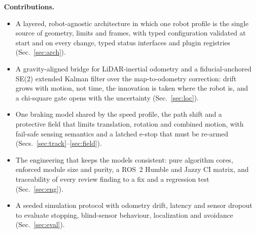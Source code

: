 \textbf{Contributions.}
\begin{itemize}
  \item A layered, robot-agnostic architecture in which one robot profile is the single source
    of geometry, limits and frames, with typed configuration validated at start and on every
    change, typed status interfaces and plugin registries (Sec.~\ref{sec:arch}).
  \item A gravity-aligned bridge for LiDAR-inertial odometry and a fiducial-anchored SE(2)
    extended Kalman filter over the map-to-odometry correction: drift grows with motion, not
    time, the innovation is taken where the robot is, and a chi-square gate opens with the
    uncertainty (Sec.~\ref{sec:loc}).
  \item One braking model shared by the speed profile, the path shift and a protective field
    that limits translation, rotation and combined motion, with fail-safe sensing semantics and
    a latched e-stop that must be re-armed (Secs.~\ref{sec:track}--\ref{sec:field}).
  \item The engineering that keeps the models consistent: pure algorithm cores, enforced module
    size and purity, a ROS~2 Humble and Jazzy CI matrix, and traceability of every review
    finding to a fix and a regression test (Sec.~\ref{sec:eng}).
  \item A seeded simulation protocol with odometry drift, latency and sensor dropout to evaluate
    stopping, blind-sensor behaviour, localization and avoidance (Sec.~\ref{sec:eval}).
\end{itemize}
